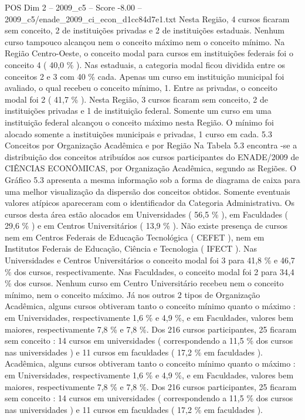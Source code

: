 \begin{textsample}{POS Dim 2 – 2009\_c5 – Score -8.00 – 2009\_c5/enade\_2009\_ci\_econ\_d1cc84d7e1.txt}
Nesta Região, 4 cursos ficaram sem conceito, 2 de instituições privadas e 2 de instituições estaduais.
Nenhum curso tampouco alcançou nem o conceito máximo nem o conceito mínimo.
Na Região Centro-Oeste, o conceito modal para cursos em instituições federais foi o conceito 4 ( 40,0 \% ).
Nas estaduais, a categoria modal ficou dividida entre os conceitos 2 e 3 com 40 \% cada.
Apenas um curso em instituição municipal foi avaliado, o qual recebeu o conceito mínimo, 1.
Entre as privadas, o conceito modal foi 2 ( 41,7 \% ).
Nesta Região, 3 cursos ficaram sem conceito, 2 de instituições privadas e 1 de instituição federal.
Somente um curso em uma instituição federal alcançou o conceito máximo nesta Região.
O mínimo foi alocado somente a instituições municipais e privadas, 1 curso em cada. 5.3 Conceitos por Organização Acadêmica e por Região Na Tabela 5.3 encontra -se a distribuição dos conceitos atribuídos aos cursos participantes do ENADE/2009 de CIÊNCIAS ECONÔMICAS, por Organização Acadêmica, segundo as Regiões.
O Gráfico 5.3 apresenta a mesma informação sob a forma de diagrama de caixa para uma melhor visualização da dispersão dos conceitos obtidos.
Somente eventuais valores atípicos apareceram com o identificador da Categoria Administrativa.
Os cursos desta área estão alocados em Universidades ( 56,5 \% ), em Faculdades ( 29,6 \% ) e em Centros Universitários ( 13,9 \% ).
Não existe presença de cursos nem em Centros Federais de Educação Tecnológica ( CEFET ), nem em Institutos Federais de Educação, Ciência e Tecnologia ( IFECT ).
Nas Universidades e Centros Universitários o conceito modal foi 3 para 41,8 \% e 46,7 \% dos cursos, respectivamente.
Nas Faculdades, o conceito modal foi 2 para 34,4 \% dos cursos.
Nenhum curso em Centro Universitário recebeu nem o conceito mínimo, nem o conceito máximo.
Já nos outros 2 tipos de Organização Acadêmica, alguns cursos obtiveram tanto o conceito mínimo quanto o máximo : em Universidades, respectivamente 1,6 \% e 4,9 \%, e em Faculdades, valores bem maiores, respectivamente 7,8 \% e 7,8 \%.
Dos 216 cursos participantes, 25 ficaram sem conceito : 14 cursos em universidades ( correspondendo a 11,5 \% dos cursos nas universidades ) e 11 cursos em faculdades ( 17,2 \% em faculdades ).
Acadêmica, alguns cursos obtiveram tanto o conceito mínimo quanto o máximo : em Universidades, respectivamente 1,6 \% e 4,9 \%, e em Faculdades, valores bem maiores, respectivamente 7,8 \% e 7,8 \%.
Dos 216 cursos participantes, 25 ficaram sem conceito : 14 cursos em universidades ( correspondendo a 11,5 \% dos cursos nas universidades ) e 11 cursos em faculdades ( 17,2 \% em faculdades ).

\end{textsample}
